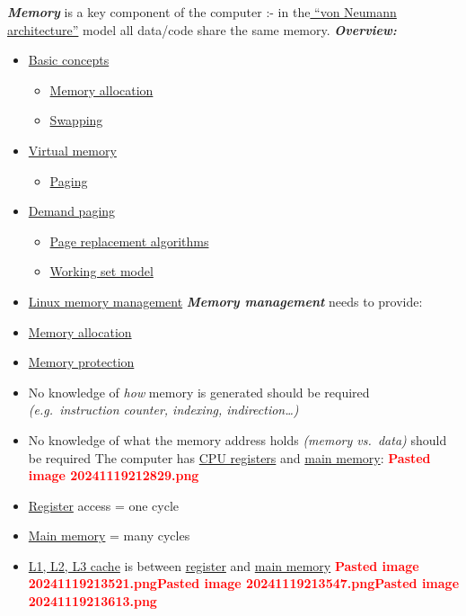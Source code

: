 \textbf{\textit{Memory}} is a key component of the computer :- in
the\ul{ ``von Neumann architecture''} model all data/code share the same
memory. \textbf{\textit{Overview:}}

\begin{itemize}
\tightlist
\item
  \ul{Basic concepts}

  \begin{itemize}
  \tightlist
  \item
    \ul{Memory allocation}
  \item
    \ul{Swapping}
  \end{itemize}
\item
  \ul{Virtual memory}

  \begin{itemize}
  \tightlist
  \item
    \ul{Paging}
  \end{itemize}
\item
  \ul{Demand paging}

  \begin{itemize}
  \tightlist
  \item
    \ul{Page replacement algorithms}
  \item
    \ul{Working set model}
  \end{itemize}
\item
  \ul{Linux memory management} \textbf{\textit{Memory management}} needs
  to provide:
\item
  \ul{Memory allocation}
\item
  \ul{Memory protection}
\item
  No knowledge of \textit{how} memory is generated should be required
  \textit{(e.g.~instruction counter, indexing, indirection\ldots)}
\item
  No knowledge of what the memory address holds \textit{(memory
  vs.~data)} should be required The computer has \ul{CPU registers} and
  \ul{main memory}:
  \textcolor{red}{\textbf{Pasted image 20241119212829.png}}
\item
  \ul{Register} access = one cycle
\item
  \ul{Main memory} = many cycles
\item
  \ul{L1, L2, L3 cache} is between \ul{register} and \ul{main memory}
  \textcolor{red}{\textbf{Pasted image 20241119213521.png}}\textcolor{red}{\textbf{Pasted image 20241119213547.png}}\textcolor{red}{\textbf{Pasted image 20241119213613.png}}
\end{itemize}

